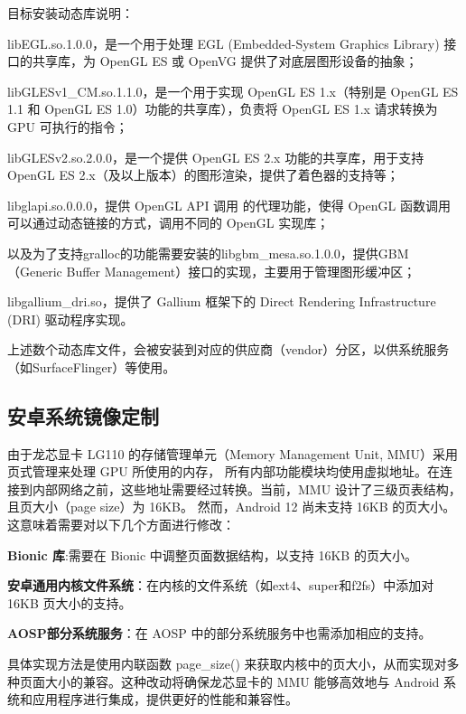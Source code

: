 目标安装动态库说明：

libEGL.so.1.0.0，是一个用于处理 EGL (Embedded-System Graphics Library) 接口的共享库，为 OpenGL ES 或 OpenVG 提供了对底层图形设备的抽象；

libGLESv1\_CM.so.1.1.0，是一个用于实现 OpenGL ES 1.x（特别是 OpenGL ES 1.1 和 OpenGL ES 1.0）功能的共享库），负责将 OpenGL ES 1.x 请求转换为 GPU 可执行的指令；

libGLESv2.so.2.0.0，是一个提供 OpenGL ES 2.x 功能的共享库，用于支持 OpenGL ES 2.x（及以上版本）的图形渲染，提供了着色器的支持等；

libglapi.so.0.0.0，提供 OpenGL API 调用 的代理功能，使得 OpenGL 函数调用可以通过动态链接的方式，调用不同的 OpenGL 实现库；

以及为了支持gralloc的功能需要安装的libgbm\_mesa.so.1.0.0，提供GBM（Generic Buffer Management）接口的实现，主要用于管理图形缓冲区；

libgallium\_dri.so，提供了 Gallium 框架下的 Direct Rendering Infrastructure (DRI) 驱动程序实现。

上述数个动态库文件，会被安装到对应的供应商（vendor）分区，以供系统服务（如SurfaceFlinger）等使用。


\subsection{安卓系统镜像定制}
由于龙芯显卡 LG110 的存储管理单元（Memory Management Unit, MMU）采用页式管理来处理 GPU 所使用的内存，
所有内部功能模块均使用虚拟地址。在连接到内部网络之前，这些地址需要经过转换。当前，MMU 设计了三级页表结构，且页大小（page size）为 16KB。
然而，Android 12 尚未支持 16KB 的页大小。这意味着需要对以下几个方面进行修改：

\textbf{Bionic 库}:需要在 Bionic 中调整页面数据结构，以支持 16KB 的页大小。

\textbf{安卓通用内核文件系统}：在内核的文件系统（如ext4、super和f2fs）中添加对 16KB 页大小的支持。

\textbf{AOSP部分系统服务}：在 AOSP 中的部分系统服务中也需添加相应的支持。

具体实现方法是使用内联函数 page\_size() 来获取内核中的页大小，从而实现对多种页面大小的兼容。这种改动将确保龙芯显卡的 MMU 
能够高效地与 Android 系统和应用程序进行集成，提供更好的性能和兼容性。


